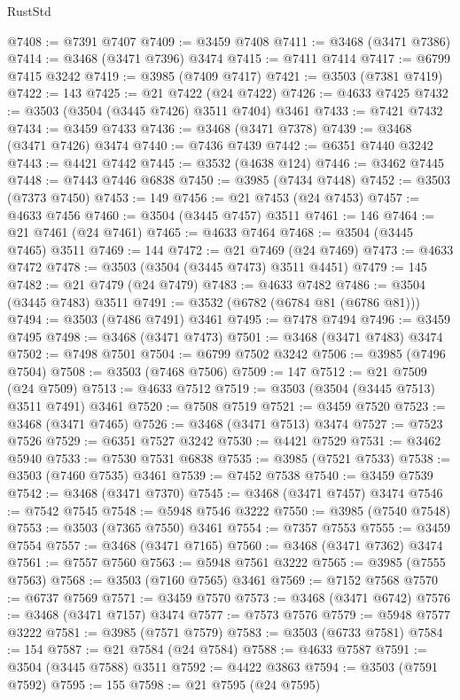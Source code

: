 \begin{lexlean}{RustStd}
\begin{coremodule}
@7408 := @7391 @7407
@7409 := @3459 @7408
@7411 := @3468 (@3471 @7386)
@7414 := @3468 (@3471 @7396) @3474
@7415 := @7411 @7414
@7417 := @6799 @7415 @3242
@7419 := @3985 (@7409 @7417)
@7421 := @3503 (@7381 @7419)
@7422 := 143
@7425 := @21 @7422 (@24 @7422)
@7426 := @4633 @7425
@7432 := @3503 (@3504 (@3445 @7426) @3511 @7404) @3461
@7433 := @7421 @7432
@7434 := @3459 @7433
@7436 := @3468 (@3471 @7378)
@7439 := @3468 (@3471 @7426) @3474
@7440 := @7436 @7439
@7442 := @6351 @7440 @3242
@7443 := @4421 @7442
@7445 := @3532 (@4638 @124)
@7446 := @3462 @7445
@7448 := @7443 @7446 @6838
@7450 := @3985 (@7434 @7448)
@7452 := @3503 (@7373 @7450)
@7453 := 149
@7456 := @21 @7453 (@24 @7453)
@7457 := @4633 @7456
@7460 := @3504 (@3445 @7457) @3511
@7461 := 146
@7464 := @21 @7461 (@24 @7461)
@7465 := @4633 @7464
@7468 := @3504 (@3445 @7465) @3511
@7469 := 144
@7472 := @21 @7469 (@24 @7469)
@7473 := @4633 @7472
@7478 := @3503 (@3504 (@3445 @7473) @3511 @4451)
@7479 := 145
@7482 := @21 @7479 (@24 @7479)
@7483 := @4633 @7482
@7486 := @3504 (@3445 @7483) @3511
@7491 := @3532 (@6782 (@6784 @81 (@6786 @81)))
@7494 := @3503 (@7486 @7491) @3461
@7495 := @7478 @7494
@7496 := @3459 @7495
@7498 := @3468 (@3471 @7473)
@7501 := @3468 (@3471 @7483) @3474
@7502 := @7498 @7501
@7504 := @6799 @7502 @3242
@7506 := @3985 (@7496 @7504)
@7508 := @3503 (@7468 @7506)
@7509 := 147
@7512 := @21 @7509 (@24 @7509)
@7513 := @4633 @7512
@7519 := @3503 (@3504 (@3445 @7513) @3511 @7491) @3461
@7520 := @7508 @7519
@7521 := @3459 @7520
@7523 := @3468 (@3471 @7465)
@7526 := @3468 (@3471 @7513) @3474
@7527 := @7523 @7526
@7529 := @6351 @7527 @3242
@7530 := @4421 @7529
@7531 := @3462 @5940
@7533 := @7530 @7531 @6838
@7535 := @3985 (@7521 @7533)
@7538 := @3503 (@7460 @7535) @3461
@7539 := @7452 @7538
@7540 := @3459 @7539
@7542 := @3468 (@3471 @7370)
@7545 := @3468 (@3471 @7457) @3474
@7546 := @7542 @7545
@7548 := @5948 @7546 @3222
@7550 := @3985 (@7540 @7548)
@7553 := @3503 (@7365 @7550) @3461
@7554 := @7357 @7553
@7555 := @3459 @7554
@7557 := @3468 (@3471 @7165)
@7560 := @3468 (@3471 @7362) @3474
@7561 := @7557 @7560
@7563 := @5948 @7561 @3222
@7565 := @3985 (@7555 @7563)
@7568 := @3503 (@7160 @7565) @3461
@7569 := @7152 @7568
@7570 := @6737 @7569
@7571 := @3459 @7570
@7573 := @3468 (@3471 @6742)
@7576 := @3468 (@3471 @7157) @3474
@7577 := @7573 @7576
@7579 := @5948 @7577 @3222
@7581 := @3985 (@7571 @7579)
@7583 := @3503 (@6733 @7581)
@7584 := 154
@7587 := @21 @7584 (@24 @7584)
@7588 := @4633 @7587
@7591 := @3504 (@3445 @7588) @3511
@7592 := @4422 @3863
@7594 := @3503 (@7591 @7592)
@7595 := 155
@7598 := @21 @7595 (@24 @7595)

\end{coremodule}
\end{lexlean}
